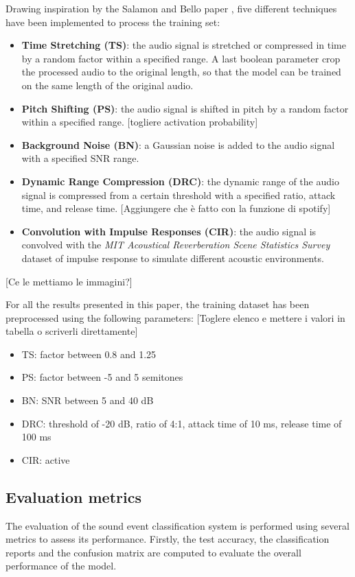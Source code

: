 \documentclass{article}
\begin{document}
\begin{sloppy}
Drawing inspiration by the Salamon and Bello paper \cite{salamon2017deep}, five different techniques have been implemented to process the training set:
\begin{itemize}
    \item \textbf{Time Stretching (TS)}: the audio signal is stretched or compressed in time by a random factor within a specified range. A last boolean parameter crop the processed audio to the original length, so that the model can be trained on the same length of the original audio.
    \item \textbf{Pitch Shifting (PS)}: the audio signal is shifted in pitch by a random factor within a specified range. [togliere activation probability]
    \item \textbf{Background Noise (BN)}: a Gaussian noise is added to the audio signal with a specified SNR range.
    \item \textbf{Dynamic Range Compression (DRC)}: the dynamic range of the audio signal is compressed from a certain threshold with a specified ratio, attack time, and release time. [Aggiungere che è fatto con la funzione di spotify]
    \item \textbf{Convolution with Impulse Responses (CIR)}: the audio signal is convolved with the \textit{MIT Acoustical Reverberation Scene Statistics Survey} dataset of impulse response \cite{traer2016statistics} to simulate different acoustic environments.
\end{itemize}

[Ce le mettiamo le immagini?]

For all the results presented in this paper, the training dataset has been preprocessed using the following parameters: [Toglere elenco e mettere i valori in tabella o scriverli direttamente] 
\begin{itemize}
    \item TS: factor between 0.8 and 1.25
    \item PS: factor between -5 and 5 semitones
    \item BN: SNR between 5 and 40 dB
    \item DRC: threshold of -20 dB, ratio of 4:1, attack time of 10 ms, release time of 100 ms
    \item CIR: active
\end{itemize}


\subsection{Evaluation metrics}
\label{sec:metrics}
The evaluation of the sound event classification system is performed using several metrics to assess its performance.
Firstly, the test accuracy, the classification reports and the confusion matrix are computed to evaluate the overall performance of the model.


\end{sloppy}
\end{document}
